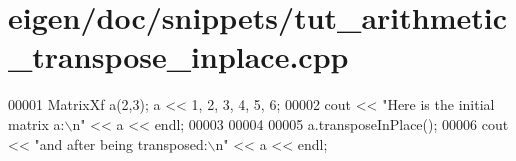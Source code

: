 \hypertarget{eigen_2doc_2snippets_2tut__arithmetic__transpose__inplace_8cpp_source}{}\section{eigen/doc/snippets/tut\+\_\+arithmetic\+\_\+transpose\+\_\+inplace.cpp}
\label{eigen_2doc_2snippets_2tut__arithmetic__transpose__inplace_8cpp_source}

\begin{DoxyCode}
00001 MatrixXf a(2,3); a << 1, 2, 3, 4, 5, 6;
00002 cout << \textcolor{stringliteral}{"Here is the initial matrix a:\(\backslash\)n"} << a << endl;
00003 
00004 
00005 a.transposeInPlace();
00006 cout << \textcolor{stringliteral}{"and after being transposed:\(\backslash\)n"} << a << endl;
\end{DoxyCode}
